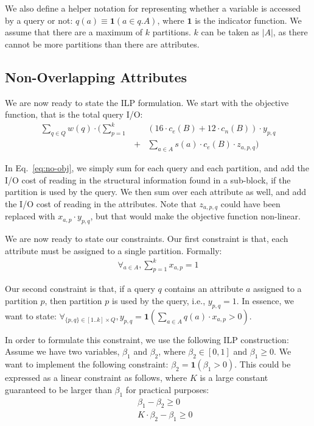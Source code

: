 We also define a helper notation for representing whether a variable is
accessed by a query or not: $q(a)\equiv \mathbf{1}(a \in q.A)$, where
$\mathbf{1}$ is the indicator function. We assume that there are a maximum of
$k$ partitions. $k$ can be taken as $|A|$, as there cannot be more partitions
than there are attributes.


\subsection{Non-Overlapping Attributes}\label{subsubsec:nov-ilp}



We are now ready to state the ILP formulation. We start with the objective
function, that is the total query I/O:
\begin{eqnarray}
\sum_{q\in Q} w(q) \cdot \Big(\sum_{p=1}^{k} \!\!&&\!\! (16\cdot c_e(B) + 12\cdot c_n(B))\cdot
y_{p,q}\nonumber\\ 
&+& \sum_{a\in A} s(a)\cdot c_e(B)\cdot z_{a,p,q}\Big)\label{eq:no-obj}
\end{eqnarray}

In Eq.~\ref{eq:no-obj}, we simply sum for each query and each partition, and
add the I/O cost of reading in the structural information found in a
sub-block, if the partition is used by the query. We then sum over each
attribute as well, and add the I/O cost of reading in the attributes. Note
that $z_{a,p,q}$ could have been  replaced with $x_{a,p}\cdot y_{p,q}$, but
that would make the objective function non-linear. 

We are now ready to state our constraints. Our first constraint is that, each
attribute must be assigned to a single partition. Formally:
\begin{eqnarray}
\forall_{a\in A}, \sum_{p=1}^{k} x_{a,p} = 1
\end{eqnarray}

Our second constraint is that, if a query $q$ contains an attribute $a$
assigned to a partition $p$, then partition $p$ is used by the query, i.e.,
$y_{p,q}=1$. In essence, we want to state: $\forall_{\{p,q\}\in [1..k]\times
Q}, y_{p,q} = \mathbf{1}(\sum_{a\in A} q(a)\cdot x_{a,p}>0)$. 

In order to formulate this constraint, we use the following ILP  construction:
Assume we have two variables, $\beta_1$ and $\beta_2$, where $\beta_2\in[0,1]$
and $\beta_1\geq 0$. We want to implement the following constraint: $\beta_2 =
\mathbf{1}(\beta_1 > 0)$. This could be expressed as a linear constraint as
follows, where $K$ is a large constant guaranteed to be larger than $\beta_1$
for practical purposes:
\begin{eqnarray}
&& \beta_1 - \beta_2 \geq 0\nonumber\\
&& K\cdot\beta_2 - \beta_1 \geq 0\label{eq:beta-ilp}
\end{eqnarray}

